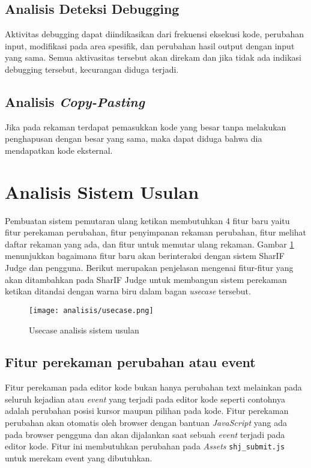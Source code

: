 \subsection{Analisis Deteksi Debugging}

Aktivitas debugging dapat diindikasikan dari frekuensi eksekusi kode, perubahan input, modifikasi pada area spesifik, dan perubahan hasil output dengan input yang sama. Semua aktivasitas tersebut akan direkam dan jika tidak ada indikasi debugging tersebut, kecurangan diduga terjadi.

\subsection{Analisis \textit{Copy-Pasting}}

Jika pada rekaman terdapat pemasukkan kode yang besar tanpa melakukan penghapusan dengan besar yang sama, maka dapat diduga bahwa dia mendapatkan kode eksternal.

\section{Analisis Sistem Usulan}
\label{sec:3:sistemusulan}

Pembuatan sistem pemutaran ulang ketikan membutuhkan 4 fitur baru yaitu fitur perekaman perubahan, fitur penyimpanan rekaman perubahan, fitur melihat daftar rekaman yang ada, dan fitur untuk memutar ulang rekaman. Gambar \ref{fig:3:usecase} menunjukkan bagaimana fitur baru akan berinteraksi dengan sistem SharIF Judge dan pengguna. Berikut merupakan penjelasan mengenai fitur-fitur yang akan ditambahkan pada SharIF Judge untuk membangun sistem perekaman ketikan ditandai dengan warna biru dalam bagan \textit{usecase} tersebut.

\begin{figure}[H]
	\centering
	\texttt{[image: analisis/usecase.png]}
	\caption{Usecase analisis sistem usulan}
	\label{fig:3:usecase}
\end{figure}

\subsection{Fitur perekaman perubahan atau event}
\label{sub:3:2:rekam}
Fitur perekaman pada editor kode bukan hanya perubahan text melainkan pada seluruh kejadian atau \textit{event} yang terjadi pada editor kode seperti contohnya adalah perubahan posisi kursor maupun pilihan pada kode. Fitur perekaman perubahan akan otomatis oleh browser dengan bantuan \textit{JavaScript} yang ada pada browser pengguna dan akan dijalankan saat sebuah \textit{event} terjadi pada editor kode. Fitur ini membutuhkan perubahan pada \textit{Assets} \verb|shj_submit.js| untuk merekam event yang dibutuhkan.

